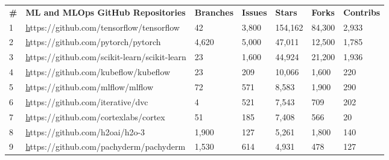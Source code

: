 \documentclass{article}
\begin{document}
\begin{table}[ht]
\centering
\begin{tabular}{lllllll}
\textbf{\#} & \textbf{ML and MLOps GitHub Repositories}                                     & \textbf{Branches} & \textbf{Issues} & \textbf{Stars} & \textbf{Forks} & \textbf{Contribs} \\
1           & {\color[HTML]{0563C1} {\ul https://github.com/tensorflow/tensorflow}}         & 42                & 3,800           & 154,162        & 84,300         & 2,933            \\
2           & {\color[HTML]{0563C1} {\ul https://github.com/pytorch/pytorch}}               & 4,620             & 5,000           & 47,011         & 12,500         & 1,785            \\
3           & {\color[HTML]{0563C1} {\ul https://github.com/scikit-learn/scikit-learn}}     & 23                & 1,600           & 44,924         & 21,200         & 1,936            \\
4           & {\color[HTML]{0563C1} {\ul https://github.com/kubeflow/kubeflow}}             & 23                & 209             & 10,066         & 1,600          & 220              \\
5           & {\color[HTML]{0563C1} {\ul https://github.com/mlflow/mlflow}}                 & 72                & 571             & 8,583          & 1,900          & 290              \\
6           & {\color[HTML]{0563C1} {\ul https://github.com/iterative/dvc}}                 & 4                 & 521             & 7,543          & 709            & 202              \\
7           & {\color[HTML]{0563C1} {\ul https://github.com/cortexlabs/cortex}}             & 51                & 185             & 7,408          & 566            & 20               \\
8           & {\color[HTML]{0563C1} {\ul https://github.com/h2oai/h2o-3}}                   & 1,900             & 127             & 5,261          & 1,800          & 140              \\
9           & {\color[HTML]{0563C1} {\ul https://github.com/pachyderm/pachyderm}}           & 1,530             & 614             & 4,931          & 478            & 127              \\

\end{tabular}
\end{table}
\end{document}
